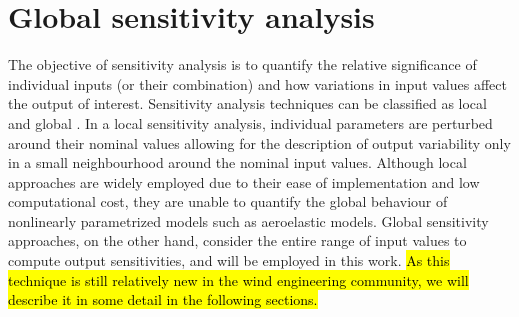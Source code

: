 %



\section{Global sensitivity analysis}\label{sec:GSA}
The objective of sensitivity analysis is to quantify the relative significance of individual inputs (or their combination) and how variations in input values affect the output of interest. Sensitivity analysis techniques can be classified as local and global \cite{RSmith}. In a local sensitivity analysis, individual parameters are perturbed around their nominal values allowing for the description of output variability only in a small neighbourhood around the nominal input values. Although local approaches are widely employed due to their ease of implementation and low computational cost, they are unable to quantify the global behaviour of nonlinearly parametrized models such as aeroelastic models. Global sensitivity approaches, on the other hand, consider the entire range of input values to compute output sensitivities, and will be employed in this work. \hl{As this technique is still relatively new in the wind engineering community, we will describe it in some detail in the following sections.}

